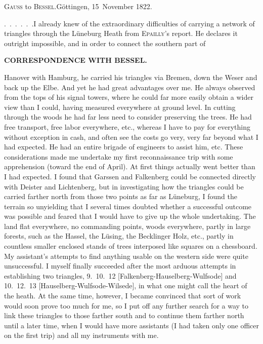 \begin{center}
\textsc{Gauss} to \textsc{Bessel}.\quad Göttingen, 15~November 1822.
\end{center}

\begingroup
\makeatletter
\renewcommand{\@makefnmark}{\hbox{\normalfont\textsuperscript{*})}}
\long{}
\makeatother
\par\noindent\hspace*{\parindent}.\ .\ .\ .\ .\ .\quad I already knew of the extraordinary difficulties of carrying a network of triangles through the Lüneburg Heath from \textsc{Epailly}'s report. He declares it outright impossible, and in order to connect the southern part of
\par\clearpage
{}\hfill{\small\textbf{CORRESPONDENCE WITH BESSEL.}}\par\medskip
\noindent Hanover with Hamburg, he carried his triangles via Bremen, down the Weser and back up the Elbe.
And yet he had great advantages over me. He always observed from the tops of his signal towers, where he could far more easily obtain a wider view than I could, having measured everywhere at ground level. In cutting through the woods he had far less need to consider preserving the trees. He had free transport, free labor everywhere, etc., whereas I have to pay for everything without exception in cash, and often see the costs go very, very far beyond what I had expected. He had an entire brigade of engineers to assist him, etc.
These considerations made me undertake my first reconnaissance trip with some apprehension (toward the end of April).
At first things actually went better than I had expected. I found that Garssen and Falkenberg could be connected directly with Deister and Lichtenberg, but in investigating how the triangles could be carried farther north from those two points as far as Lüneburg, I found the terrain so unyielding that I several times doubted whether a successful outcome was possible and feared that I would have to give up the whole undertaking.
The land flat everywhere, no commanding points, woods everywhere, partly in large forests, such as the Hassel, the Lüsing, the Becklinger Holz, etc., partly in countless smaller enclosed stands of trees interposed like squares on a chessboard.
My assistant's attempts to find anything usable on the western side were quite unsuccessful. I myself finally succeeded after the most arduous attempts in establishing two triangles, 9.~10.~12 [Falkenberg-Hauselberg-Wulfsode] and 10.~12.~13 [Hauselberg-Wulfsode-Wilsede], in what one might call the heart of the heath. At the same time, however, I became convinced that  sort of work would soon prove too much for me, so I put off any further search for a way to link these triangles to those farther south and to continue them farther north until a later time, when I would have more assistants (I had taken only one officer on the first trip) and all my instruments with me.
